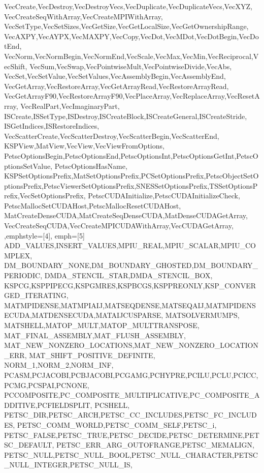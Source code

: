 {{{{{    VecCreate,VecDestroy,VecDestroyVecs,VecDuplicate,VecDuplicateVecs,VecXYZ,
    VecCreateSeqWithArray,VecCreateMPIWithArray,
    VecSetType,VecSetSizes,VecGetSize,VecGetLocalSize,VecGetOwnershipRange,
    VecAXPY,VecAYPX,VecMAXPY,VecCopy,VecDot,VecMDot,VecDotBegin,VecDotEnd,
    VecNorm,VecNormBegin,VecNormEnd,VecScale,VecMax,VecMin,VecReciprocal,VecShift,
    VecSum,VecSwap,VecPointwiseMult,VecPointwiseDivide,VecAbs,
    VecSet,VecSetValue,VecSetValues,VecAssemblyBegin,VecAssemblyEnd,
    VecGetArray,VecRestoreArray,VecGetArrayRead,VecRestoreArrayRead,
    VecGetArrayF90,VecRestoreArrayF90,VecPlaceArray,VecReplaceArray,VecResetArray,
    VecRealPart,VecImaginaryPart,
    ISCreate,ISSetType,ISDestroy,ISCreateBlock,ISCreateGeneral,ISCreateStride,
    ISGetIndices,ISRestoreIndices,
    VecScatterCreate,VecScatterDestroy,VecScatterBegin,VecScatterEnd,
    KSPView,MatView,VecView,VecViewFromOptions,
    PetscOptionsBegin,PetscOptionsEnd,PetscOptionsInt,PetscOptionsGetInt,PetscOptionsSetValue,
    PetscOptionsHasName,
    KSPSetOptionsPrefix,MatSetOptionsPrefix,PCSetOptionsPrefix,PetscObjectSetOptionsPrefix,PetscViewerSetOptionsPrefix,SNESSetOptionsPrefix,TSSetOptionsPrefix,VecSetOptionsPrefix,
    PetscCUDAInitialize,PetscCUDAInitializeCheck,
    PetscMallocSetCUDAHost,PetscMallocResetCUDAHost,
    MatCreateDenseCUDA,MatCreateSeqDenseCUDA,MatDenseCUDAGetArray,
    VecCreateSeqCUDA,VecCreateMPICUDAWithArray,VecCUDAGetArray,
  },emphstyle={[4]\color{red!70!black}\bfseries},
  emph={[5] %
    ADD_VALUES,INSERT_VALUES,MPIU_REAL,MPIU_SCALAR,MPIU_COMPLEX,
    DM_BOUNDARY_NONE,DM_BOUNDARY_GHOSTED,DM_BOUNDARY_PERIODIC,
    DMDA_STENCIL_STAR,DMDA_STENCIL_BOX,
    KSPCG,KSPPIPECG,KSPGMRES,KSPBCGS,KSPPREONLY,KSP_CONVERGED_ITERATING,
    MATMPIDENSE,MATMPIAIJ,MATSEQDENSE,MATSEQAIJ,MATMPIDENSECUDA,MATDENSECUDA,MATAIJCUSPARSE,
    MATSOLVERMUMPS,
    MATSHELL,MATOP_MULT,MATOP_MULTTRANSPOSE,
    MAT_FINAL_ASSEMBLY,MAT_FLUSH_ASSEMBLY,
    MAT_NEW_NONZERO_LOCATIONS,MAT_NEW_NONZERO_LOCATION_ERR,
    MAT_SHIFT_POSITIVE_DEFINITE,
    NORM_1,NORM_2,NORM_INF,
    PCASM,PCJACOBI,PCBJACOBI,PCGAMG,PCHYPRE,PCILU,PCLU,PCICC,PCMG,PCSPAI,PCNONE,
    PCCOMPOSITE,PC_COMPOSITE_MULTIPLICATIVE,PC_COMPOSITE_ADDITIVE,PCFIELDSPLIT,
    PCSHELL,
    PETSC_DIR,PETSC_ARCH,PETSC_CC_INCLUDES,PETSC_FC_INCLUDES,
    PETSC_COMM_WORLD,PETSC_COMM_SELF,PETSC_i,
    PETSC_FALSE,PETSC_TRUE,PETSC_DECIDE,PETSC_DETERMINE,PETSC_DEFAULT,
    PETSC_ERR_ARG_OUTOFRANGE,PETSC_MEMALIGN,
    PETSC_NULL,PETSC_NULL_BOOL,PETSC_NULL_CHARACTER,PETSC_NULL_INTEGER,PETSC_NULL_IS,
}}}}}
